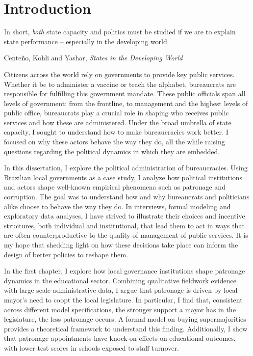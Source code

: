 \section*{Introduction}

\epigraph{\singlespacing In short, \emph{both} state capacity and politics must be studied if we are to explain state performance -- especially in the developing world.}{\singlespacing Cente\~{n}o, Kohli and Yashar, \emph{States in the Developing World}}

\doublespacing

Citizens across the world rely on governments to provide key public services. Whether it be to administer a vaccine or teach the alphabet, bureaucrats are responsible for fulfilling this government mandate. These public officials span all levels of government: from the frontline, to management and the highest levels of public office, bureaucrats play a crucial role in shaping who receives public services and how these are administered. Under the broad umbrella of state capacity, I sought to understand how to make bureaucracies work better. I focused on why these actors behave the way they do, all the while raising questions regarding the political dynamics in which they are embedded.

In this dissertation, I explore the political administration of bureaucracies. Using Brazilian local governments as a case study, I analyze how political institutions and actors shape well-known empirical phenomena such as patronage and corruption. The goal was to understand how and why bureaucrats and politicians alike choose to behave the way they do. In interviews, formal modeling and exploratory data analyses, I have strived to illustrate their choices and incentive structures, both individual and institutional, that lead them to act in ways that are often counterproductive to the quality of management of public services. It is my hope that shedding light on how these decisions take place can inform the design of better policies to reshape them.

In the first chapter, I explore how local governance institutions shape patronage dynamics in the educational sector. Combining qualitative fieldwork evidence with large scale administrative data, I argue that patronage is driven by local mayor's need to coopt the local legislature. In particular, I find that, consistent across different model specifications, the stronger support a mayor has in the legislature, the less patronage occurs. A formal model on buying supermajorities provides a theoretical framework to understand this finding. Additionally, I show that patronage appointments have knock-on effects on educational outcomes, with lower test scores in schools exposed to staff turnover.

